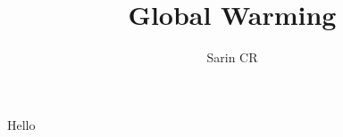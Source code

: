 \documentclass[11pt]{beamer}
\author{Sarin CR}
\title{Global Warming}
\institute{STC}
\begin{document}
\begin{frame}
\titlepage
\end{frame}

\begin{frame}
\tableofcontents
\end{frame}

\begin{frame}
Hello
\end{frame}
\end{document}
